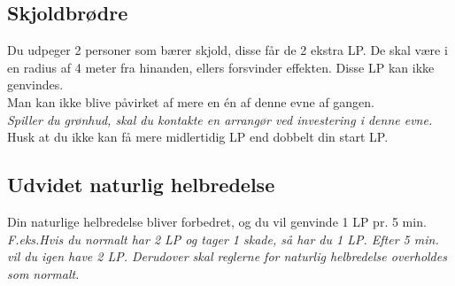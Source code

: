 \subsection{Skjoldbrødre}
Du udpeger 2 personer som bærer skjold, disse får de 2 ekstra LP. De skal være i en radius af 4 meter fra hinanden, ellers forsvinder effekten. Disse LP kan ikke genvindes.\\
Man kan ikke blive påvirket af mere en én af denne evne af gangen.\\
\emph{Spiller du grønhud, skal du kontakte en arrangør ved investering i denne evne.}\\
Husk at du ikke kan få mere midlertidig LP end dobbelt din start LP.\\


\subsection{Udvidet naturlig helbredelse}
Din naturlige helbredelse bliver forbedret, og du vil genvinde 1 LP pr. 5 min.\\ 
\textit{F.eks.\newline Hvis du normalt har 2 LP og tager 1 skade, så har du 1 LP. Efter 5 min. vil du igen have 2 LP. Derudover skal reglerne for naturlig helbredelse overholdes som normalt.}